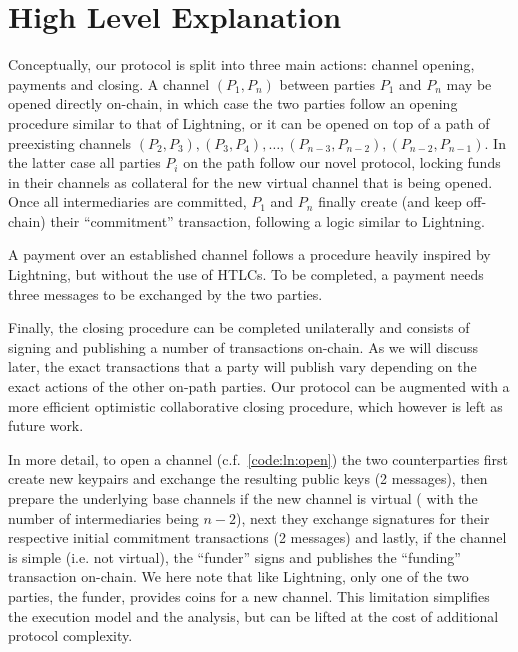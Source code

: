 \section{High Level Explanation}
  Conceptually, our protocol is split into three main actions: channel opening,
  payments and closing. A channel $(P_1, P_n)$ between parties $P_1$ and $P_n$
  may be opened directly on-chain, in which case the two parties follow an
  opening procedure similar to that of Lightning, or it can be opened
  on top of a path of preexisting channels $(P_2, P_3), (P_3, P_4), \dots,
  (P_{n-3}, P_{n-2}), (P_{n-2}, P_{n-1})$. In the latter case all parties $P_i$
  on the path follow our novel protocol, locking funds in their channels as
  collateral for the new virtual channel that is being opened. Once all
  intermediaries are committed, $P_1$ and $P_n$ finally create (and keep
  off-chain) their ``commitment'' transaction, following a logic similar to
  Lightning.

  A payment over an established channel follows a procedure heavily inspired by
  Lightning, but without the use of HTLCs. To be completed, a payment needs
  three messages to be exchanged by the two parties.

  Finally, the closing procedure can be completed unilaterally and consists of
  signing and publishing a number of transactions on-chain. As we will discuss
  later, the exact transactions that a party will publish vary depending on the
  exact actions of the other on-path parties. Our protocol can be augmented with
  a more efficient optimistic collaborative closing procedure, which however is
  left as future work.

  In more detail, to open a channel (c.f.~\ref{code:ln:open}) the two
  counterparties first create new keypairs and exchange the resulting public
  keys (2 messages), then prepare the underlying base channels if the new
  channel is virtual ( with the number of intermediaries
  being $n-2$), next they exchange signatures for their respective initial
  commitment transactions (2 messages) and lastly, if the channel is simple
  (i.e. not virtual), the ``funder'' signs and publishes the ``funding''
  transaction on-chain.  We here note that like Lightning, only one of the two
  parties, the funder, provides coins for a new channel. This limitation
  simplifies the execution model and the analysis, but can be lifted at the cost
  of additional protocol complexity.

